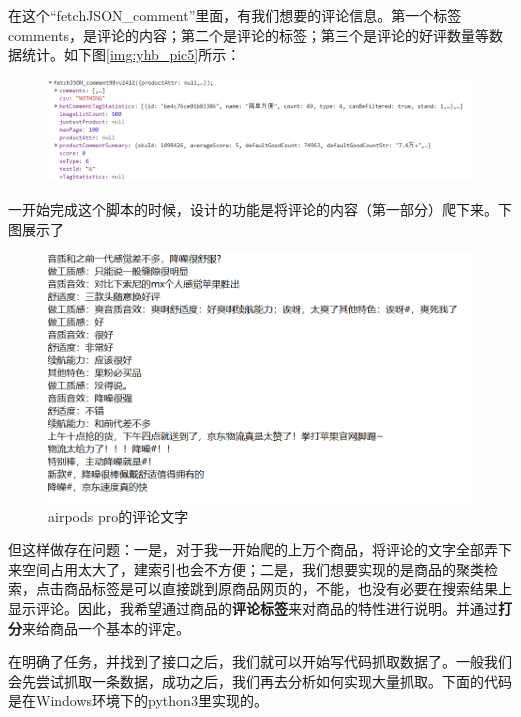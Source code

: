 在这个“fetchJSON\_comment”里面，有我们想要的评论信息。第一个标签comments，是评论的内容；第二个是评论的标签；第三个是评论的好评数量等数据统计。如下图\ref{img:yhb_pic5}所示：
\begin{figure}[htbp]
\centering
\includegraphics[width=13.5cm]{img/yhb/json_items_jd.png}
\label{img:yhb_pict5}   %
\end{figure}



一开始完成这个脚本的时候，设计的功能是将评论的内容（第一部分）爬下来。下图展示了
\begin{figure}[htbp]
\centering
\includegraphics[width=13.5cm]{img/yhb/cmt_contents_eg_jd.png}
\caption{airpods pro的评论文字} %
\end{figure}
但这样做存在问题：一是，对于我一开始爬的上万个商品，将评论的文字全部弄下来空间占用太大了，建索引也会不方便；二是，我们想要实现的是商品的聚类检索，点击商品标签是可以直接跳到原商品网页的，不能，也没有必要在搜索结果上显示评论。因此，我希望通过商品的\textbf{评论标签}来对商品的特性进行说明。并通过\textbf{打分}来给商品一个基本的评定。

在明确了任务，并找到了接口之后，我们就可以开始写代码抓取数据了。一般我们会先尝试抓取一条数据，成功之后，我们再去分析如何实现大量抓取。下面的代码是在Windows环境下的python3里实现的。

